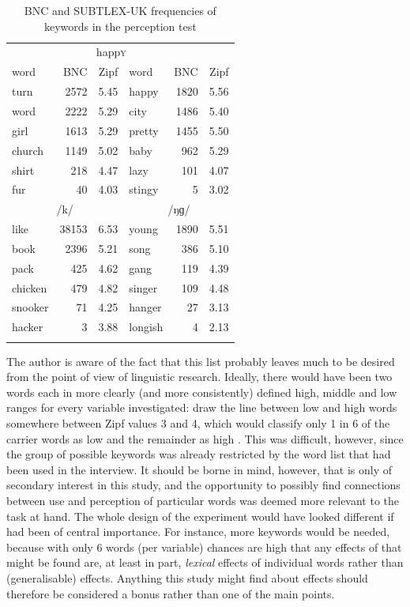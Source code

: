 \begin{table}
	\caption{BNC and SUBTLEX-UK frequencies of keywords in the perception test}
	\label{tab.keywords.frequency}
	
	\begin{tabular}{lrrlrr}
		\lsptoprule
		\multicolumn{3}{c}{\textsc{nurse}} & \multicolumn{3}{c}{happ\textsc{y}}\\
		word & BNC & Zipf\is{Zipf score} & word & BNC & Zipf\is{Zipf score} \\
		\midrule
		turn & 2572 & 5.45 & happy & 1820 & 5.56 \\
		word & 2222 & 5.29 & city & 1486 & 5.40 \\
		girl & 1613 & 5.29 & pretty & 1455 & 5.50 \\			
		church & 1149 & 5.02 & baby & 962 & 5.29 \\
		shirt & 218 & 4.47 & lazy & 101 & 4.07 \\
		fur & 40 & 4.03 & stingy & 5 & 3.02 \\
		\midrule
		\multicolumn{3}{c}{/k/} & \multicolumn{3}{c}{/ŋɡ/}\\
		\midrule
		like & 38153 & 6.53 & young & 1890 & 5.51\\
		book & 2396 & 5.21 & song & 386 & 5.10\\
		pack & 425 & 4.62 & gang & 119 & 4.39\\
		chicken & 479 & 4.82 & singer & 109 & 4.48\\
		snooker & 71 & 4.25 & hanger & 27 & 3.13\\
		hacker & 3 & 3.88 & longish & 4 & 2.13\\
		\lspbottomrule
	\end{tabular}
\end{table}

The author is aware of the fact that this list probably leaves much to be desired from the point of view of linguistic  research.
Ideally, there would have been two words each in more clearly (and more consistently) defined high, middle and low  ranges for every variable investigated: \textcite{heuvenetal2014} draw the line between low  and high  words somewhere between Zipf values 3 and 4, which would classify only 1 in 6 of the carrier words as low  and the remainder as high .
This was difficult, however, since the group of possible keywords was already restricted by the word list that had been used in the interview.
It should be borne in mind, however, that  is only of secondary interest in this study, and the opportunity to possibly find connections between use and perception of particular words was deemed more relevant to the task at hand.
The whole design of the experiment would have looked different if  had been of central importance.
For instance, more keywords would be needed, because with only 6 words (per variable) chances are high that any effects of  that might be found are, at least in part, \emph{lexical} effects of individual words rather than (generalisable)  effects.
Anything this study might find about  effects should therefore be considered a bonus rather than one of the main points.

